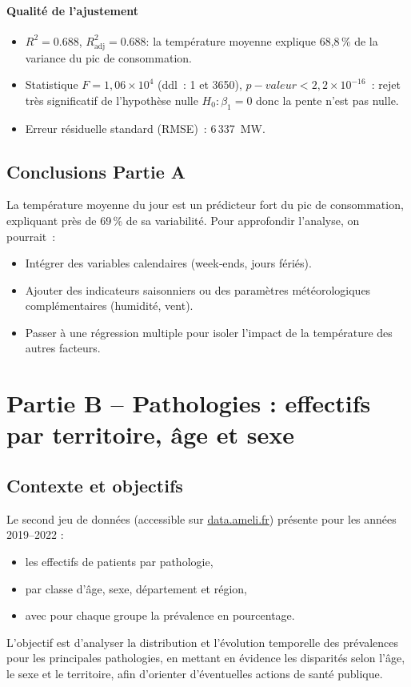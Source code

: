 \documentclass[12pt,a4paper]{article}
\begin{document}
\paragraph{Qualité de l’ajustement}
\begin{itemize}
  \item $R^2 = 0.688$, $R^2_{\mathrm{adj}} = 0.688$: la température moyenne explique 68,8\,\% de la variance du pic de consommation.
  \item Statistique $F = 1{,}06 \times 10^4$ (ddl : 1 et 3650), $p-valeur < 2{,}2\times10^{-16}$ : rejet très significatif de l’hypothèse nulle $H_0: \beta_1 = 0$ donc la pente n’est pas nulle.
  \item Erreur résiduelle standard (RMSE) : 6\,337 MW.
\end{itemize}

\subsection{Conclusions Partie A}
La température moyenne du jour est un prédicteur fort du pic de consommation, expliquant près de 69\,\% de sa variabilité.  
Pour approfondir l’analyse, on pourrait :
\begin{itemize}
  \item Intégrer des variables calendaires (week‑ends, jours fériés).
  \item Ajouter des indicateurs saisonniers ou des paramètres météorologiques complémentaires (humidité, vent).
  \item Passer à une régression multiple pour isoler l’impact de la température des autres facteurs.
\end{itemize}
\newpage
\section{Partie B -- Pathologies : effectifs par territoire, âge et sexe}
\subsection{Contexte et objectifs}
Le second jeu de données (accessible sur \href{https://data.ameli.fr/explore/dataset/effectifs/information/}{data.ameli.fr}) présente pour les années 2019--2022 :
\begin{itemize}
  \item les effectifs de patients par pathologie,
  \item par classe d'âge, sexe, département et région,
  \item avec pour chaque groupe la prévalence en pourcentage.
\end{itemize}
L'objectif est d'analyser la distribution et l’évolution temporelle des prévalences pour les principales pathologies,  
en mettant en évidence les disparités selon l’âge, le sexe et le territoire, afin d’orienter d’éventuelles actions de santé publique. 
\end{document}
